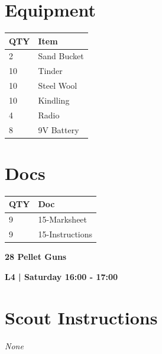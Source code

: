 \documentclass[10pt]{article}
\newcommand{\newtitle}[1]{\begin{center}{\Huge\bfseries #1 }\\ \vspace{5mm}\end{center}}
\newcommand{\newsubtitle}[1]{\begin{center}{\color{grey}\Large\bfseries #1 }\\ \vspace{5mm}\end{center}}
\begin{document}
	\begin{multicols}{2}

		\section*{\faWrench \: Equipment}

		
	\begin{center}
			\begin{tabular}{p{2cm}p{4cm}}


				\textbf{QTY} & \textbf{Item} \\\toprule
												2&Sand Bucket\\\midrule
												10&Tinder\\\midrule
												10&Steel Wool\\\midrule
												10&Kindling\\\midrule
												4&Radio\\\midrule
												8&9V Battery\\\midrule
								\end{tabular}

			\end{center}

		
		\vfill\null
		\columnbreak

			\section*{\faFile \: Docs}
		 	\begin{center}
			\begin{tabular}{p{2cm}p{4cm}}

			\textbf{QTY} & \textbf{Doc} \\\toprule
										9&15-Marksheet\\\midrule
										9&15-Instructions\\\midrule
							\end{tabular}
			\end{center}
	

		\vfill\null

		\end{multicols}



	\vspace{1cm}


	\clearpage
		\newtitle{28 Pellet Guns }
	\newsubtitle{L4 | Saturday 16:00 - 17:00}
		\setcounter{section}{27}
	\section*{Scout Instructions}
		\textit{None}
	
\end{document}
